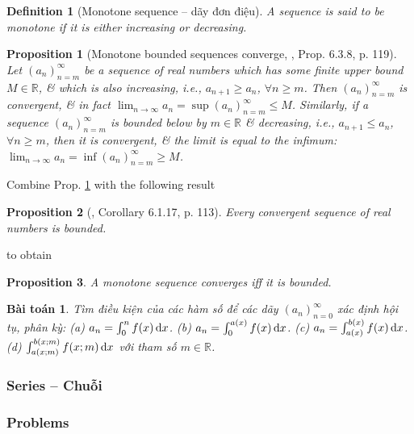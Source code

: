 \documentclass{article}
\newtheorem{baitoan}{Bài toán}
\newtheorem{definition}{Definition}
\newtheorem{proposition}{Proposition}
\begin{document}
\begin{definition}[Monotone sequence -- dãy đơn điệu]
	A sequence is said to be {\rm monotone} if it is either increasing or decreasing.
\end{definition}

\begin{proposition}[Monotone bounded sequences converge, \cite{Tao_analysis_1}, Prop. 6.3.8, p. 119]
	\label{prop: monotone bounded sequences converge}
	Let $(a_n)_{n=m}^\infty$ be a sequence of real numbers which has some finite upper bound $M\in\mathbb{R}$, \& which is also increasing, i.e., $a_{n+1}\ge a_n$, $\forall n\ge m$. Then $(a_n)_{n=m}^\infty$ is convergent, \& in fact $\lim_{n\to\infty} a_n = \sup(a_n)_{n=m}^\infty\le M$. Similarly, if a sequence $(a_n)_{n=m}^\infty$ is bounded below by $m\in\mathbb{R}$ \& decreasing, i.e., $a_{n+1}\le a_n$, $\forall n\ge m$, then it is convergent, \& the limit is equal to the infimum: $\lim_{n\to\infty} a_n = \inf(a_n)_{n=m}^\infty\ge M$.
\end{proposition}
Combine Prop. \ref{prop: monotone bounded sequences converge} with the following result
\begin{proposition}[\cite{Tao_analysis_1}, Corollary 6.1.17, p. 113]
	Every convergent sequence of real numbers is bounded.
\end{proposition}
to obtain
\begin{proposition}
	A monotone sequence converges iff it is bounded.
\end{proposition}

\begin{baitoan}
	Tìm điều kiện của các hàm số để các dãy $(a_n)_{n=0}^\infty$ xác định hội tụ, phân kỳ: (a) $a_n = \int_0^n f(x)\,{\rm d}x$. (b) $a_n = \int_0^{a(x)} f(x)\,{\rm d}x$. (c) $a_n = \int_{a(x)}^{b(x)} f(x)\,{\rm d}x$. (d) $\int_{a(x;m)}^{b(x;m)} f(x;m)\,{\rm d}x$ với tham số $m\in\mathbb{R}$.
\end{baitoan}


\subsubsection{Series -- Chuỗi}


\subsubsection{Problems}
\end{document}
